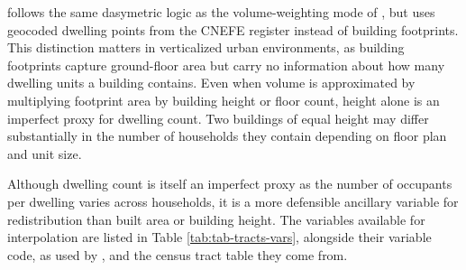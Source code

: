  follows the same dasymetric logic as the
volume-weighting mode of , but uses geocoded dwelling
points from the CNEFE register instead of building footprints. This
distinction matters in verticalized urban environments, as building
footprints capture ground-floor area but carry no information about how
many dwelling units a building contains. Even when volume is
approximated by multiplying footprint area by building height or floor
count, height alone is an imperfect proxy for dwelling count. Two
buildings of equal height may differ substantially in the number of
households they contain depending on floor plan and unit size.

Although dwelling count is itself an imperfect proxy as the number of
occupants per dwelling varies across households, it is a more defensible
ancillary variable for redistribution than built area or building
height. The variables available for interpolation are listed in Table
\ref{tab:tab-tracts-vars}, alongside their variable code, as used by
, and the census tract table they come from.

